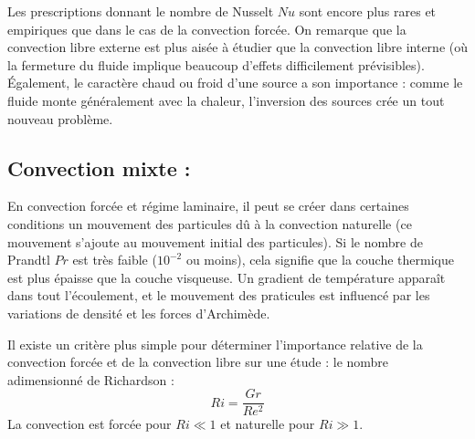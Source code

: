 Les prescriptions donnant le nombre de Nusselt $Nu$ sont encore plus rares et empiriques que dans le cas de la convection forcée. On remarque que la convection libre externe est plus aisée à étudier que la convection libre interne (où la fermeture du fluide implique beaucoup d'effets difficilement prévisibles). Également, le caractère chaud ou froid d'une source a son importance : comme le fluide monte généralement avec la chaleur, l'inversion des sources crée un tout nouveau problème.


\subsection{Convection mixte :}

En convection forcée et régime laminaire, il peut se créer dans certaines conditions un mouvement des particules dû à la convection naturelle (ce mouvement s'ajoute au mouvement initial des particules). Si le nombre de Prandtl $Pr$ est très faible ($10^{-2}$ ou moins), cela signifie que la couche thermique est plus épaisse que la couche visqueuse. Un gradient de température apparaît dans tout l'écoulement, et le mouvement des praticules est influencé par les variations de densité et les forces d'Archimède.

Il existe un critère plus simple pour déterminer l'importance relative de la convection forcée et de la convection libre sur une étude : le nombre adimensionné de Richardson :
%
\begin{equation}
    Ri = \frac{Gr}{Re^2}
\end{equation}
%
La convection est forcée pour $Ri \ll 1$ et naturelle pour $Ri \gg 1$.

